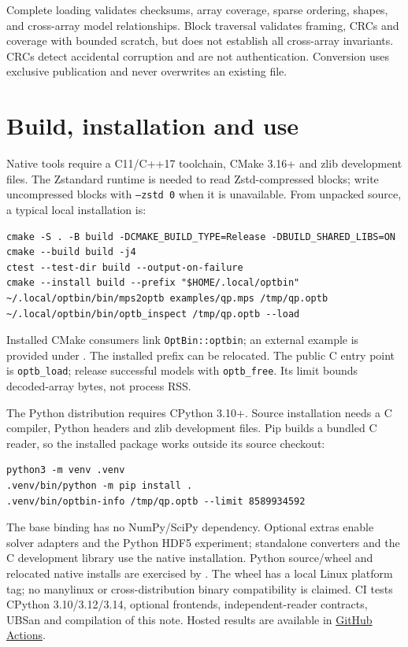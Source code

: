 \documentclass[10pt]{article}
\begin{document}
Complete loading validates checksums, array coverage, sparse ordering, shapes,
and cross-array model relationships. Block traversal validates framing, CRCs
and coverage with bounded scratch, but does not establish all cross-array
invariants. CRCs detect accidental corruption and are not authentication.
Conversion uses exclusive publication and never overwrites an existing file.

\clearpage
\section{Build, installation and use}
Native tools require a C11/C++17 toolchain, CMake 3.16+ and zlib development
files. The Zstandard runtime is needed to read Zstd-compressed blocks; write
uncompressed blocks with \texttt{--zstd 0} when it is unavailable. From unpacked
source, a typical local installation is:
\begin{verbatim}
cmake -S . -B build -DCMAKE_BUILD_TYPE=Release -DBUILD_SHARED_LIBS=ON
cmake --build build -j4
ctest --test-dir build --output-on-failure
cmake --install build --prefix "$HOME/.local/optbin"
~/.local/optbin/bin/mps2optb examples/qp.mps /tmp/qp.optb
~/.local/optbin/bin/optb_inspect /tmp/qp.optb --load
\end{verbatim}
Installed CMake consumers link \texttt{OptBin::optbin}; an external example is
provided under . The installed prefix can be relocated.
The public C entry point is \texttt{optb\_load}; release successful models with
\texttt{optb\_free}. Its limit bounds decoded-array bytes, not process RSS.

The Python distribution requires CPython 3.10+. Source installation needs a C
compiler, Python headers and zlib development files. Pip builds a bundled C
reader, so the installed package works outside its source checkout:
\begin{verbatim}
python3 -m venv .venv
.venv/bin/python -m pip install .
.venv/bin/optbin-info /tmp/qp.optb --limit 8589934592
\end{verbatim}
The base binding has no NumPy/SciPy dependency. Optional extras enable solver
adapters and the Python HDF5 experiment; standalone converters and the C
development library use the native installation. Python source/wheel and
relocated native installs are exercised by .
The wheel has a local Linux platform tag; no manylinux or cross-distribution
binary compatibility is claimed. CI tests CPython 3.10/3.12/3.14, optional
frontends, independent-reader contracts, UBSan and compilation of this note.
Hosted results are available in
\href{https://github.com/PolyU-IOR/OptBin/actions}{GitHub Actions}.
\end{document}

